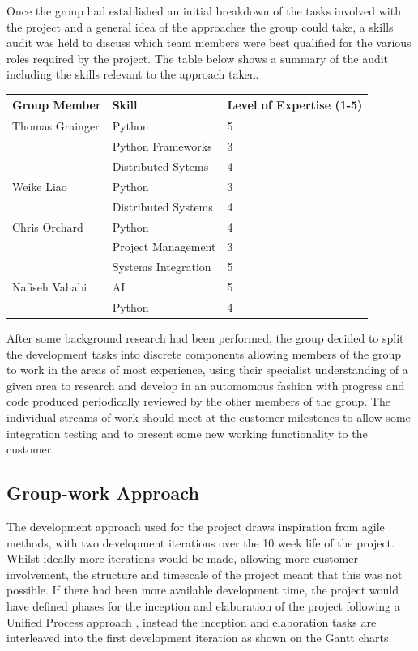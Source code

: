 Once the group had established an initial breakdown of the tasks involved with the
project and a general idea of the approaches the group could take,
 a skills audit was held to discuss which team members were best
qualified for the various roles required by the project. The table below shows
a summary of the audit including the skills relevant to the approach taken.

\begin{center}
\begin{tabularx}{\linewidth}{|XXX|}
\hline
Group Member & Skill & Level of Expertise (1-5) \\ \hline
Thomas Grainger & Python & 5 \\
& Python Frameworks & 3 \\
& Distributed Sytems & 4 \\ \hline
Weike Liao & Python & 3 \\
& Distributed Systems & 4 \\ \hline
Chris Orchard & Python & 4 \\
& Project Management & 3 \\
& Systems Integration & 5 \\ \hline
Nafiseh Vahabi & AI & 5 \\
& Python & 4 \\
\hline
\end{tabularx}
\end{center}

After some background research had been performed, the group decided to split
the development tasks into discrete components allowing members of the group to
work in the areas of most experience, using their specialist understanding of a
given area to research and develop in an automomous fashion with progress and
code produced periodically reviewed by the other members of the group. The
individual streams of work should meet at the customer milestones to allow some
integration testing and to present some new working functionality to the
customer.

\subsection{Group-work Approach}
The development approach used for the project draws inspiration from agile
methods, with two
development iterations over the 10 week life of the project. Whilst ideally more
iterations would be made, allowing more customer involvement, the
structure and timescale of the project meant that this was not possible. If
there had been more available development time, the project would have defined
phases for the inception and elaboration of the project following a Unified
Process approach \cite{jacobson1999unified}, instead the inception and elaboration tasks are
interleaved into the first development iteration as shown on the Gantt charts. 

